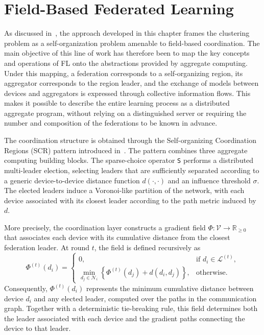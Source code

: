 \section{Field-Based Federated Learning}
\label{sec:selforgfl-approach}

As discussed in~, 
 the approach developed in this chapter frames the clustering problem as a self-organization problem 
 amenable to field-based coordination.
%
The main objective of this line of work has therefore been to map the key
concepts and operations of \gls{FL} onto the abstractions provided by aggregate
computing.
%
Under this mapping, a federation corresponds to a self-organizing region, its
aggregator corresponds to the region leader, and the exchange of models between
devices and aggregators is expressed through collective information flows.
%
This makes it possible to describe the entire learning process as a distributed
aggregate program, without relying on a distinguished server or requiring the
number and composition of the federations to be known in advance.

The coordination structure is obtained through the
Self-organizing Coordination Regions (\gls{SCR}) pattern introduced 
 in~.
%
The pattern combines three aggregate computing building blocks.
%
The sparse-choice operator \texttt{S} performs a distributed multi-leader
election, selecting leaders that are sufficiently separated according to a
generic device-to-device distance function \(d(\cdot,\cdot)\) and an influence
threshold \(\sigma\).
%
The elected leaders induce a Voronoi-like partition of the network, with each
device associated with its closest leader according to the path metric induced
by \(d\).

More precisely, the coordination layer constructs a gradient field
\(\Phi : \mathcal{V} \rightarrow \mathbb{R}_{\geq 0}\) that associates each
device with its cumulative distance from the closest federation leader.
%
At round \(t\), the field is defined recursively as
%
\begin{equation}
  \Phi^{(t)}(d_i) =
  \begin{cases}
    0,
      & \text{if } d_i \in \mathcal{L}^{(t)}, \\[2mm]
    \displaystyle
    \min_{d_j \in \mathcal{N}_i}
    \left\{
      \Phi^{(t)}(d_j) + d(d_i,d_j)
    \right\},
      & \text{otherwise}.
  \end{cases}
  \label{eq:generic-federation-gradient}
\end{equation}
%
Consequently, \(\Phi^{(t)}(d_i)\) represents the minimum cumulative distance
between device \(d_i\) and any elected leader, computed over the paths in the
communication graph.
%
Together with a deterministic tie-breaking rule, this field determines both
the leader associated with each device and the gradient paths connecting the
device to that leader.

